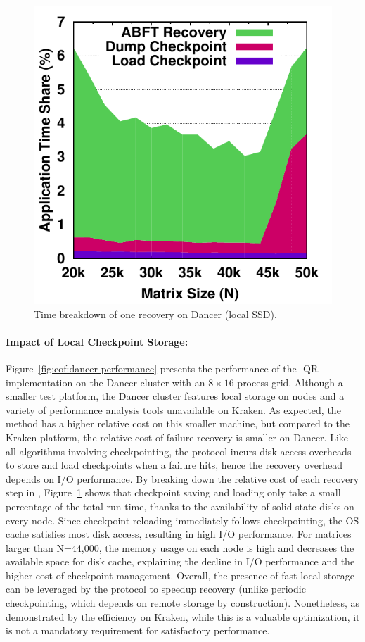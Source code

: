 \begin{figure}[t]
	\centering
    \includegraphics[width=.8\linewidth]{figures/dancer-1-error-timing-process-new-data}
    \caption{Time breakdown of one \cof recovery on Dancer (local SSD).}
    \label{fig:cof:dancer-timing}
\end{figure}

\paragraph*{Impact of Local Checkpoint Storage:}
Figure~\ref{fig:cof:dancer-performance} presents the performance of the \cof-QR
implementation on the Dancer cluster with an $8 \times 16$ process grid. Although
a smaller test platform, the Dancer cluster features local storage on nodes and
a variety of performance analysis tools unavailable on Kraken. As expected, the 
\abft method has a higher relative cost on this
smaller machine, but compared to the Kraken platform, the relative cost of \cof
failure recovery is smaller on Dancer. Like all algorithms involving 
checkpointing, the \cof protocol incurs disk access overheads to
store and load checkpoints when a failure hits, hence the recovery overhead
depends on I/O performance. By breaking down the relative cost of each recovery
step in \cof, Figure~\ref{fig:cof:dancer-timing} shows that checkpoint saving
and loading only take a small percentage of the total run-time, thanks to the
availability of solid state disks on every node. Since checkpoint reloading
immediately follows checkpointing, the OS cache satisfies most disk access,
resulting in high I/O performance. For matrices larger than N=44,000, the memory
usage on each node is high and decreases the available space for disk cache,
explaining the decline in I/O performance and the higher cost of checkpoint
management. Overall, the presence of fast local storage can be leveraged by the
\cof protocol to speedup recovery (unlike periodic checkpointing, which depends
on remote storage by construction). Nonetheless, as demonstrated by the
efficiency on Kraken, while this is a valuable optimization, it is not a
mandatory requirement for satisfactory performance.

